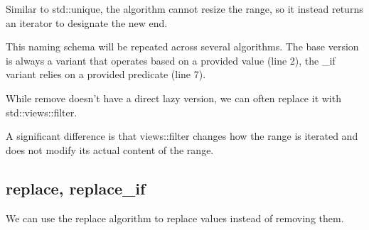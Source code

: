 

Similar to std::unique, the algorithm cannot resize the range, so it instead returns an iterator to designate the new end.

\begin{box-note}
\end{box-note}

This naming schema will be repeated across several algorithms. The base version is always a variant that operates based on a provided value (line 2), the \_if variant relies on a provided predicate (line 7).

While remove doesn’t have a direct lazy version, we can often replace it with std::views::filter.

\begin{box-note}
\end{box-note}

A significant difference is that views::filter changes how the range is iterated and does not modify its actual content of the range.

\subsection{replace, replace\_if}

We can use the replace algorithm to replace values instead of removing them.



